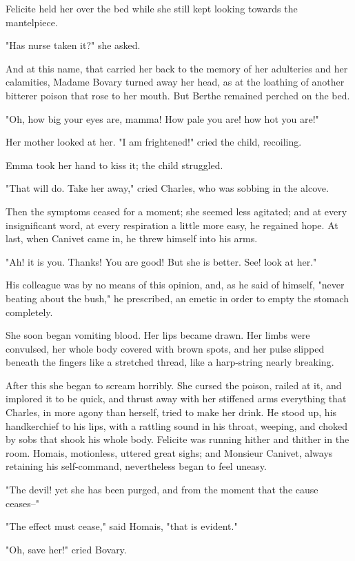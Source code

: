 \documentclass{tufte-book}
\begin{document}
Felicite held her over the bed while she still kept looking towards the
mantelpiece.

"Has nurse taken it?" she asked.

And at this name, that carried her back to the memory of her adulteries
and her calamities, Madame Bovary turned away her head, as at the
loathing of another bitterer poison that rose to her mouth. But Berthe
remained perched on the bed.

"Oh, how big your eyes are, mamma! How pale you are! how hot you are!"

Her mother looked at her. "I am frightened!" cried the child, recoiling.

Emma took her hand to kiss it; the child struggled.

"That will do. Take her away," cried Charles, who was sobbing in the
alcove.

Then the symptoms ceased for a moment; she seemed less agitated; and at
every insignificant word, at every respiration a little more easy, he
regained hope. At last, when Canivet came in, he threw himself into his
arms.

"Ah! it is you. Thanks! You are good! But she is better. See! look at
her."

His colleague was by no means of this opinion, and, as he said of
himself, "never beating about the bush," he prescribed, an emetic in
order to empty the stomach completely.

She soon began vomiting blood. Her lips became drawn. Her limbs were
convulsed, her whole body covered with brown spots, and her pulse
slipped beneath the fingers like a stretched thread, like a harp-string
nearly breaking.

After this she began to scream horribly. She cursed the poison, railed
at it, and implored it to be quick, and thrust away with her stiffened
arms everything that Charles, in more agony than herself, tried to make
her drink. He stood up, his handkerchief to his lips, with a rattling
sound in his throat, weeping, and choked by sobs that shook his whole
body. Felicite was running hither and thither in the room. Homais,
motionless, uttered great sighs; and Monsieur Canivet, always retaining
his self-command, nevertheless began to feel uneasy.

"The devil! yet she has been purged, and from the moment that the cause
ceases--"

"The effect must cease," said Homais, "that is evident."

"Oh, save her!" cried Bovary.
\end{document}
